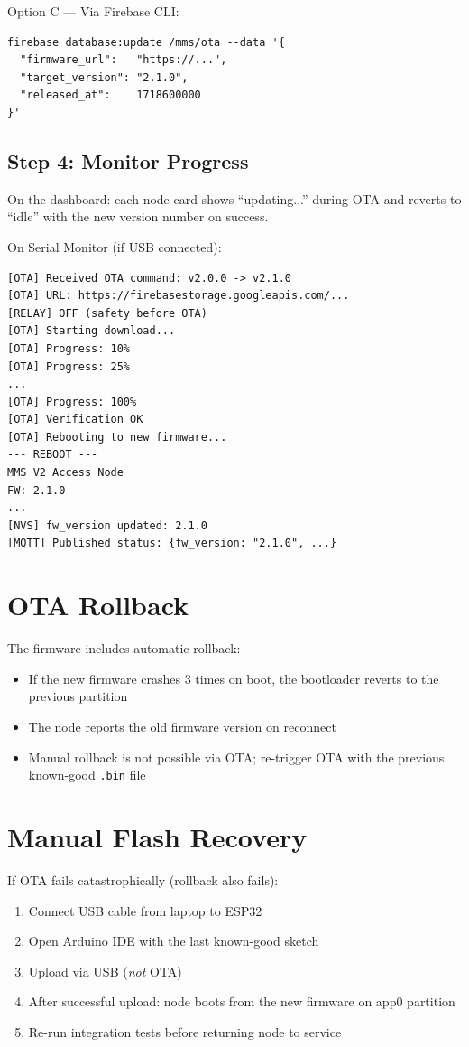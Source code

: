 Option C — Via Firebase CLI:
\begin{lstlisting}[style=bashstyle]
firebase database:update /mms/ota --data '{
  "firmware_url":   "https://...",
  "target_version": "2.1.0",
  "released_at":    1718600000
}'
\end{lstlisting}

\subsection{Step 4: Monitor Progress}

On the dashboard: each node card shows ``updating...'' during OTA and reverts to ``idle'' with the new version number on success.

On Serial Monitor (if USB connected):
\begin{verbatim}
[OTA] Received OTA command: v2.0.0 -> v2.1.0
[OTA] URL: https://firebasestorage.googleapis.com/...
[RELAY] OFF (safety before OTA)
[OTA] Starting download...
[OTA] Progress: 10%
[OTA] Progress: 25%
...
[OTA] Progress: 100%
[OTA] Verification OK
[OTA] Rebooting to new firmware...
--- REBOOT ---
MMS V2 Access Node
FW: 2.1.0
...
[NVS] fw_version updated: 2.1.0
[MQTT] Published status: {fw_version: "2.1.0", ...}
\end{verbatim}

\section{OTA Rollback}

The firmware includes automatic rollback:
\begin{itemize}[leftmargin=1.5em]
    \item If the new firmware crashes 3 times on boot, the bootloader reverts to the previous partition
    \item The node reports the old firmware version on reconnect
    \item Manual rollback is not possible via OTA; re-trigger OTA with the previous known-good \texttt{.bin} file
\end{itemize}

\section{Manual Flash Recovery}

If OTA fails catastrophically (rollback also fails):
\begin{enumerate}[leftmargin=1.5em]
    \item Connect USB cable from laptop to ESP32
    \item Open Arduino IDE with the last known-good sketch
    \item Upload via USB (\textit{not} OTA)
    \item After successful upload: node boots from the new firmware on app0 partition
    \item Re-run integration tests before returning node to service
\end{enumerate}

